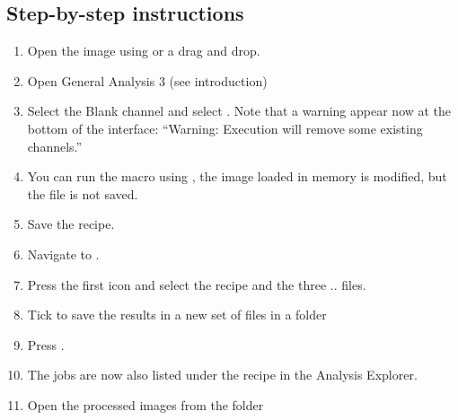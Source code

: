 \subsection{Step-by-step instructions}
\begin{enumerate} 
    \item Open the image  using  or a drag and drop.
    \item Open General Analysis 3 (see introduction)
    \item Select the Blank channel and select . Note that a warning appear now at the bottom of the interface: ``Warning: Execution will remove some existing channels.''
    \item You can run the macro using , the image loaded in memory is modified, but the file is not saved.
    \item Save the recipe.
    \item Navigate to .
    \item Press the first icon  and select the recipe and the three  ..   files.
    \item Tick  to save the results in a new set of files in a folder  
    \item Press .
    \item The jobs are now also listed under the recipe in the Analysis Explorer.
    \item Open the processed images from the folder 
\end{enumerate}